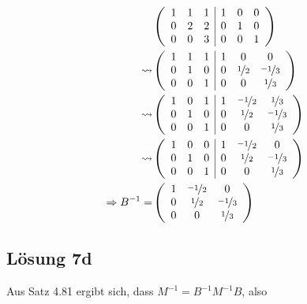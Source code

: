 \documentclass[main.tex]{subfiles}
\begin{document}
\begin{align*}
    & \eqmatrix{ccc|ccc}{
        1 & 1 & 1    &    1 & 0 & 0 \\
        0 & 2 & 2    &    0 & 1 & 0 \\
        0 & 0 & 3    &    0 & 0 & 1
    }\\
    \leadsto & \eqmatrix{ccc|ccc}{
        1 & 1 & 1    &    1 & 0   & 0 \\
        0 & 1 & 0    &    0 & \nicefrac{1}{2} & \nicefrac{-1}{3} \\
        0 & 0 & 1    &    0 & 0   & \nicefrac{1}{3}
    }\\
    \leadsto & \eqmatrix{ccc|ccc}{
        1 & 0 & 1    &    1 & \nicefrac{-1}{2} & \nicefrac{1}{3} \\
        0 & 1 & 0    &    0 & \nicefrac{1}{2}  & \nicefrac{-1}{3} \\
        0 & 0 & 1    &    0 & 0    & \nicefrac{1}{3}
    }\\
    \leadsto & \eqmatrix{ccc|ccc}{
        1 & 0 & 0    &    1 & \nicefrac{-1}{2} & 0 \\
        0 & 1 & 0    &    0 & \nicefrac{1}{2}  & \nicefrac{-1}{3} \\
        0 & 0 & 1    &    0 & 0    & \nicefrac{1}{3}
    }\\
    \Rightarrow B^{-1} = & \eqmatrix{ccc}{
        1 & \nicefrac{-1}{2} & 0 \\
        0 & \nicefrac{1}{2} & \nicefrac{-1}{3} \\
        0 & 0 & \nicefrac{1}{3}
    }\\
\end{align*}

\subsection*{Lösung 7d}
Aus Satz 4.81 ergibt sich, dass $M^{-1} = B^{-1} M^{-1} B$, also
\end{document}
